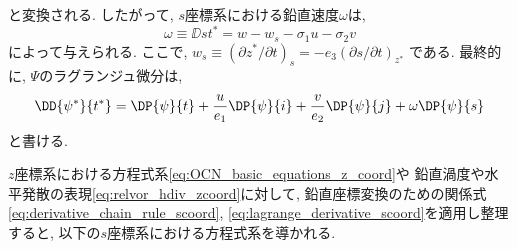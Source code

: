 と変換される. 
したがって, $s$座標系における鉛直速度$\omega$は, 
\begin{equation*}
  \omega \equiv \DD{s}{t^*} 
=  w - w_s - \sigma_1 u - \sigma_2 v
\end{equation*}
によって与えられる. ここで, 
$w_s \equiv (\partial z^*/\partial t)_s = - e_3 (\partial s/\partial t)_{z^*}$
である.
最終的に, $\Psi$のラグランジュ微分は, 
\begin{equation}
 \DD{\psi^*}{t^*} = \DP{\psi}{t} 
                     + \dfrac{u}{e_1}\DP{\psi}{i}
                     + \dfrac{v}{e_2}\DP{\psi}{j}
                     + \omega \DP{\psi}{s}
\label{eq:lagrange_derivative_scoord}
\end{equation}
と書ける. 

$z$座標系における方程式系\eqref{eq:OCN_basic_equations_z_coord}や
鉛直渦度や水平発散の表現\eqref{eq:relvor_hdiv_zcoord}に対して, 
鉛直座標変換のための関係式\eqref{eq:derivative_chain_rule_scoord}, \eqref{eq:lagrange_derivative_scoord}を適用し整理すると, 以下の$s$座標系における方程式系を導かれる. \\\\
\noindent
